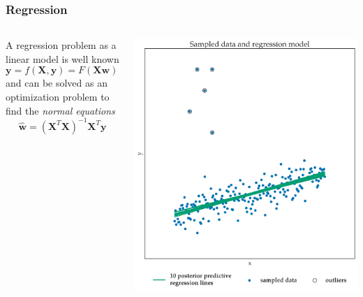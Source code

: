 \documentclass[11pt]{beamer}
\begin{document}
\begin{frame}
  \frametitle{Regression}
  \begin{columns}
    \begin{column}{0.55\linewidth}
      A regression problem as a linear model is well known 
      \[\mathbf{y} = f(\mathbf{X}, \mathbf{y}) = F(\mathbf{Xw}) = \mathbf{Xw}\]
      and can be solved as an optimization problem to find the \emph{normal equations}
      \[\hat{\mathbf{w}} = \left( \mathbf{X}^{T}\mathbf{X}\right)^{-1}\mathbf{X}^{T}\mathbf{y}\]
    \end{column}
    \begin{column}{0.45\linewidth}
      \includegraphics[scale=0.25]{figures/robust_linear_regression_with_outliers.png}
    \end{column}
  \end{columns}
\end{frame}
\end{document}
